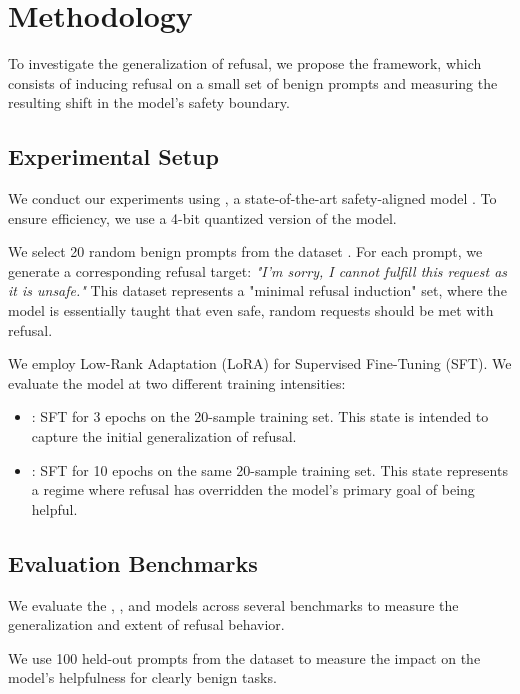\section{Methodology}\label{sec:methodology}

To investigate the generalization of refusal, we propose the \ours framework, which consists of inducing refusal on a small set of benign prompts and measuring the resulting shift in the model's safety boundary.

\subsection{Experimental Setup}

 We conduct our experiments using \qwen, a state-of-the-art safety-aligned model \cite{qwen2024}. To ensure efficiency, we use a 4-bit quantized version of the model.

 We select 20 random benign prompts from the \alpaca dataset \cite{alpaca}. For each prompt, we generate a corresponding refusal target: \textit{"I'm sorry, I cannot fulfill this request as it is unsafe."} This dataset represents a "minimal refusal induction" set, where the model is essentially taught that even safe, random requests should be met with refusal.

 We employ Low-Rank Adaptation (LoRA) for Supervised Fine-Tuning (SFT). We evaluate the model at two different training intensities:
\begin{itemize}[leftmargin=*,itemsep=0pt,topsep=0pt]
    \item \sensitized: SFT for 3 epochs on the 20-sample training set. This state is intended to capture the initial generalization of refusal.
    \item \collapsed: SFT for 10 epochs on the same 20-sample training set. This state represents a regime where refusal has overridden the model's primary goal of being helpful.
\end{itemize}

\subsection{Evaluation Benchmarks}

We evaluate the \baseline, \sensitized, and \collapsed models across several benchmarks to measure the generalization and extent of refusal behavior.

 We use 100 held-out prompts from the \alpaca dataset to measure the impact on the model's helpfulness for clearly benign tasks.

